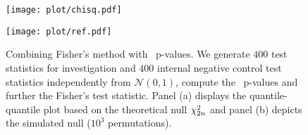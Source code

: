 \begin{figure}[tbp]
    \centering
    \begin{minipage}{8cm}
    \centering
\texttt{[image: plot/chisq.pdf]}
    \end{minipage}
    \begin{minipage}{8cm}
    \centering
\texttt{[image: plot/ref.pdf]}
    \end{minipage}
    \caption{{Combining Fisher's method with \nickname~p-values.
    We generate $400$ test statistics for investigation and $400$ internal negative control test statistics independently from $\mathcal{N}(0,1)$, compute the \nickname~p-values and further the Fisher's test statistic.
    Panel (a) displays the quantile-quantile plot based on the theoretical null $\chi^2_{2{n}}$ and panel (b) depicts the simulated null ($10^3$ permutations).
}}
    \label{fig:fisher.test}
\end{figure}



\subsection{\textcite[thm.\
  2]{bates21_testin_outlier_with_confor_p_values}}
\label{sec:bates-typo}

